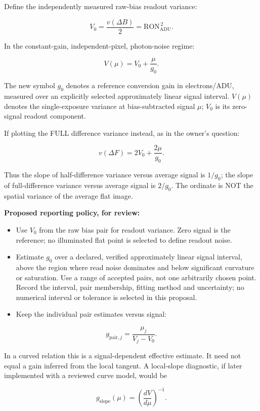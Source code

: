 \documentclass[
  10pt,
  a4paper,
]{article}
\providecommand{\tightlist}{%
  \setlength{\itemsep}{0pt}\setlength{\parskip}{0pt}}
\begin{document}
Define the independently measured raw-bias readout variance:

\[
V_0=\frac{v(\Delta B)}{2}
   =\mathrm{RON}_{\mathrm{ADU}}^{\,2}.
\]

In the constant-gain, independent-pixel, photon-noise regime:

\[
\boxed{ V(\mu)=V_0+\frac{\mu}{g_0} } .
\]

The new symbol \(g_0\) denotes a reference conversion gain in
electrons/ADU, measured over an explicitly selected approximately linear
signal interval. \(V(\mu)\) denotes the single-exposure variance at
bias-subtracted signal \(\mu\); \(V_0\) is its zero-signal readout
component.

If plotting the FULL difference variance instead, as in the owner's
question:

\[
v(\Delta F)=2V_0+\frac{2\mu}{g_0}.
\]

Thus the slope of half-difference variance versus average signal is
\(1/g_0\); the slope of full-difference variance versus average signal
is \(2/g_0\). The ordinate is NOT the spatial variance of the average
flat image.

\textbf{Proposed reporting policy, for review:}

\begin{itemize}
\tightlist
\item
  Use \(V_0\) from the raw bias pair for readout variance. Zero signal
  is the reference; no illuminated flat point is selected to define
  readout noise.
\item
  Estimate \(g_0\) over a declared, verified approximately linear signal
  interval, above the region where read noise dominates and below
  significant curvature or saturation. Use a range of accepted pairs,
  not one arbitrarily chosen point. Record the interval, pair
  membership, fitting method and uncertainty; no numerical interval or
  tolerance is selected in this proposal.
\item
  Keep the individual pair estimates versus signal:
\end{itemize}

\[
  g_{\mathrm{pair},j}=\frac{\mu_j}{V_j-V_0}.
\]

In a curved relation this is a signal-dependent effective estimate. It
need not equal a gain inferred from the local tangent. A local-slope
diagnostic, if later implemented with a reviewed curve model, would be

\[
  g_{\mathrm{slope}}(\mu)
  =\left(\frac{dV}{d\mu}\right)^{-1}.
\]
\end{document}
